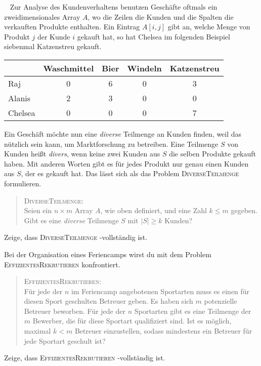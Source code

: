 \documentclass{uebung_cs}
\begin{document}
\begin{aufgabe}[Kundenanalyse]\
	Zur Analyse des Kundenverhaltens benutzen Geschäfte oftmals ein zweidimensionales Array $A$, wo die Zeilen die Kunden und die Spalten die verkauften Produkte enthalten. Ein Eintrag $A[i,j]$ gibt an, welche Menge von Produkt $j$ der Kunde $i$ gekauft hat, so hat Chelsea im folgenden Beispiel siebenmal Katzenstreu gekauft.
	
	\begin{center}
	\begin{tabular}{l c c c c}
	\hline 
	& Waschmittel & Bier & Windeln & Katzenstreu \\ 
	\hline 
	Raj & 0 & 6 & 0 & 3 \\ 
	Alanis & 2 & 3 & 0 & 0 \\ 
	Chelsea & 0 & 0 & 0 & 7 \\ 
	\hline 
	\end{tabular} 
	\end{center}
	
	Ein Geschäft möchte nun eine \textit{diverse} Teilmenge an Kunden finden, weil das nützlich sein kann, um Marktforschung zu betreiben. Eine Teilmenge $S$ von Kunden heißt \textit{divers}, wenn keine zwei Kunden aus $S$ die selben Produkte gekauft haben. Mit anderen Worten gibt es für jedes Produkt nur genau einen Kunden aus $S$, der es gekauft hat. Das lässt sich als das Problem \textsc{DiverseTeilmenge} formulieren.
	\begin{quote}
		\textsc{DiverseTeilmenge}:\\
		Seien ein $n \times m$ Array $A$, wie oben definiert, und eine Zahl $k \leq m$ gegeben. Gibt es eine \textit{diverse} Teilmenge $S$ mit $|S| \geq k$ Kunden?
	\end{quote}
	Zeige, dass \textsc{DiverseTeilmenge} \NP-vollständig ist.
\end{aufgabe}    

\begin{aufgabe}[Feriencamp]
	Bei der Organisation eines Feriencamps wirst du mit dem Problem \textsc{EffizientesRekrutieren} konfrontiert.
	\begin{quote}
		\textsc{EffizientesRekrutieren}:\\
		Für jede der $n$ im Feriencamp angebotenen Sportarten muss es einen für diesen Sport geschulten Betreuer geben. Es haben sich $m$ potenzielle Betreuer beworben. Für jede der $n$ Sportarten gibt es eine Teilmenge der $m$ Bewerber, die für diese Sportart qualifiziert sind. Ist es möglich, maximal $k < m$ Betreuer einzustellen, sodass mindestens ein Betreuer für jede Sportart geschult ist?
	\end{quote}	 
	
	Zeige, dass \textsc{EffizientesRekrutieren} \NP-vollständig ist.
\end{aufgabe}
\end{document}
